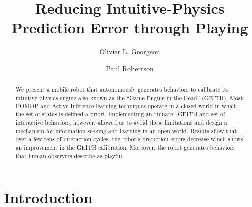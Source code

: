 \documentclass[runningheads]{llncs}
\begin{document}
%
\title{Reducing Intuitive-Physics Prediction Error through Playing}
%
%
\author{Olivier L. Georgeon \and
Paul Robertson }
%
%
%
\maketitle              %
%
\begin{abstract}
We present a mobile robot that autonomously generates behaviors to calibrate its intuitive-physics engine also known as the ``Game Engine in the Head'' (GEITH).
Most POMDP and Active Inference learning techniques operate in a closed world in which the set of states is defined a priori. 
Implementing an ``innate'' GEITH and set of interactive behaviors, however, allowed us to avoid these limitations and design a mechanism for information seeking and learning in an open world. 
Results show that over a few tens of interaction cycles, the robot's prediction errors decrease which shows an improvement in the GEITH calibration. 
Moreover, the robot generates behaviors that human observers describe as playful.

\end{abstract}
%
%
%
\section{Introduction}
\label{sec:intro}
\end{document}
